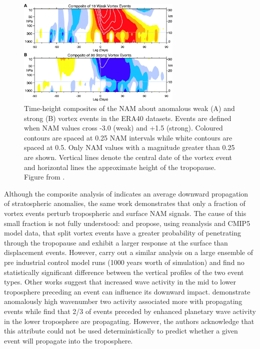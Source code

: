 \begin{figure}[h!]
\centering
    \includegraphics[width=0.7\textwidth]{Figures/Figures-background/baldwin_composite.jpg}
    \caption{Time-height composites of the NAM about anomalous weak (A) and strong (B) vortex events in the ERA40 datasets. Events are defined when NAM values cross -3.0 (weak) and +1.5 (strong). Coloured contours are spaced at 0.25 NAM intervals while white contours are spaced at 0.5. Only NAM values with a magnitude greater than 0.25 are shown. Vertical lines denote the central date of the vortex event and horizontal lines the approximate height of the tropopause. Figure from \cite{baldwinStratospheric2001}.}  
    \label{fig:Baldwin_composite}
\centering
\end{figure}

Although the composite analysis of \cite{baldwinStratospheric2001} indicates an average downward propagation of stratospheric anomalies, the same work demonstrates that only a fraction of vortex events perturb tropospheric and surface NAM signals. The cause of this small fraction is not fully understood: \cite{Mitchell2011} and \cite{Seviour2016} propose, using reanalysis and CMIP5 model data, that split vortex events have a greater probability of penetrating through the tropopause and exhibit a larger response at the surface than displacement events. However, \cite{Maycock2015} carry out a similar analysis on a large ensemble of pre industrial control model runs (1000 years worth of simulation) and find no statistically significant difference between the vertical profiles of the two event types. Other works suggest that increased wave activity in the mid to lower troposphere preceding an event can influence its downward impact. \cite{Nakagawa2006} demonstrate anomalously high wavenumber two activity associated more with propagating events while \cite{White2019} find that 2/3 of events preceded by enhanced planetary wave activity in the lower troposphere are propagating. However, the authors acknowledge that this attribute could not be used deterministically to predict whether a given event will propagate into the troposphere.

